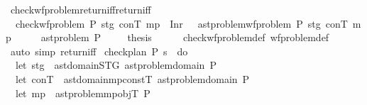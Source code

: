 \begin{isabellebody}
{\isacharbraceright}{\kern0pt}{\isachardoublequoteclose}\isanewline
\isanewline
{}\isamarkupfalse%
\ check{\isacharunderscore}{\kern0pt}wf{\isacharunderscore}{\kern0pt}problem{\isacharunderscore}{\kern0pt}return{\isacharunderscore}{\kern0pt}iff{\isacharbrackleft}{\kern0pt}return{\isacharunderscore}{\kern0pt}iff{\isacharbrackright}{\kern0pt}{\isacharcolon}{\kern0pt}\isanewline
\ \ {\isachardoublequoteopen}check{\isacharunderscore}{\kern0pt}wf{\isacharunderscore}{\kern0pt}problem\ P\ stg\ conT\ mp\ {\isacharequal}{\kern0pt}\ Inr\ {\isacharparenleft}{\kern0pt}{\isacharparenright}{\kern0pt}\ {\isasymlongleftrightarrow}\ ast{\isacharunderscore}{\kern0pt}problem{\isachardot}{\kern0pt}wf{\isacharunderscore}{\kern0pt}problem{\isacharprime}{\kern0pt}\ P\ stg\ conT\ mp{\isachardoublequoteclose}\isanewline
%
\isadelimproof
%
\endisadelimproof
%
\isatagproof
{}\isamarkupfalse%
\ {\isacharminus}{\kern0pt}\isanewline
\ \ \isamarkupfalse%
\ ast{\isacharunderscore}{\kern0pt}problem\ P\ \isakeywordONE{{\isachardot}{\kern0pt}}\isamarkupfalse%
\isanewline
\ \ \isamarkupfalse%
\ {\isacharquery}{\kern0pt}thesis\isanewline
\ \ \ \ \isamarkupfalse%
\ check{\isacharunderscore}{\kern0pt}wf{\isacharunderscore}{\kern0pt}problem{\isacharunderscore}{\kern0pt}def\ wf{\isacharunderscore}{\kern0pt}problem{\isacharprime}{\kern0pt}{\isacharunderscore}{\kern0pt}def\ \isamarkupfalse%
\ {\isacharparenleft}{\kern0pt}auto\ simp{\isacharcolon}{\kern0pt}\ return{\isacharunderscore}{\kern0pt}iff{\isacharparenright}{\kern0pt}\isanewline
{}\isamarkupfalse%
%
\endisatagproof
{\isafoldproof}%
%
\isadelimproof
\isanewline
%
\endisadelimproof
\isanewline
{}\isamarkupfalse%
\ {\isachardoublequoteopen}check{\isacharunderscore}{\kern0pt}plan\ P\ {\isasympi}s\ {\isasymequiv}\ do\ {\isacharbraceleft}{\kern0pt}\isanewline
\ \ let\ stg\ {\isacharequal}{\kern0pt}\ ast{\isacharunderscore}{\kern0pt}domain{\isachardot}{\kern0pt}STG\ {\isacharparenleft}{\kern0pt}ast{\isacharunderscore}{\kern0pt}problem{\isachardot}{\kern0pt}domain\ P{\isacharparenright}{\kern0pt}{\isacharsemicolon}{\kern0pt}\isanewline
\ \ let\ conT\ {\isacharequal}{\kern0pt}\ ast{\isacharunderscore}{\kern0pt}domain{\isachardot}{\kern0pt}mp{\isacharunderscore}{\kern0pt}constT\ {\isacharparenleft}{\kern0pt}ast{\isacharunderscore}{\kern0pt}problem{\isachardot}{\kern0pt}domain\ P{\isacharparenright}{\kern0pt}{\isacharsemicolon}{\kern0pt}\isanewline
\ \ let\ mp\ {\isacharequal}{\kern0pt}\ ast{\isacharunderscore}{\kern0pt}problem{\isachardot}{\kern0pt}mp{\isacharunderscore}{\kern0pt}objT\ P{\isacharsemicolon}{\kern0pt}\isanewline

\end{isabellebody}
